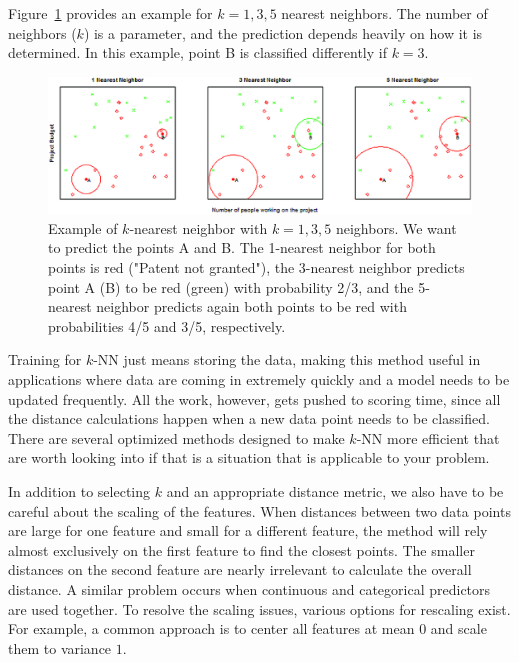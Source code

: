 \documentclass[]{krantz}
\begin{document}
Figure~\ref{fig:knn} provides an example for \(k = 1, 3, 5\) nearest
neighbors. The number of neighbors (\(k\)) is a parameter, and the
prediction depends heavily on how it is determined. In this example,
point B is classified differently if \(k = 3\).

\begin{figure}

{\centering \includegraphics[width=0.7\linewidth]{ChapterML/figures/knn} 

}

\caption{Example of $k$-nearest neighbor with $k = 1, 3, 5$ neighbors. We want to predict the points A and B. The 1-nearest neighbor for both points is red ("Patent not granted"), the 3-nearest neighbor predicts point A (B) to be red (green) with probability 2/3, and the 5-nearest neighbor predicts again both points to be red with probabilities 4/5 and 3/5, respectively.}\label{fig:knn}
\end{figure}

\vspace*{-6pt} Training for \(k\)-NN just means storing the data, making
this method useful in applications where data are coming in extremely
quickly and a model needs to be updated frequently. All the work,
however, gets pushed to scoring time, since all the distance
calculations happen when a new data point needs to be classified. There
are several optimized methods designed to make \(k\)-NN more efficient
that are worth looking into if that is a situation that is applicable to
your problem.

In addition to selecting \(k\) and an appropriate distance metric, we
also have to be careful about the scaling of the features. When
distances between two data points are large for one feature and small
for a different feature, the method will rely almost exclusively on the
first feature to find the closest points. The smaller distances on the
second feature are nearly irrelevant to calculate the overall distance.
A similar problem occurs when continuous and categorical predictors are
used together. To resolve the scaling issues, various options for
rescaling exist. For example, a common approach is to center all
features at mean \(0\) and scale them to variance \(1\).
\end{document}
